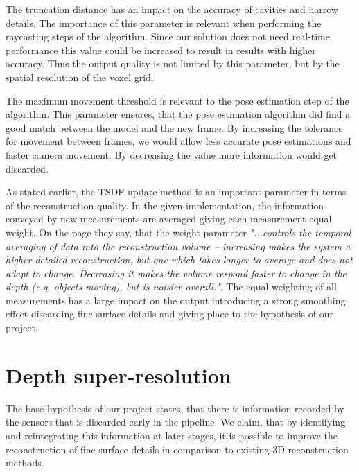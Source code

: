\documentclass{ucl_thesis}
\begin{document}
\par The truncation distance has an impact on the accuracy of cavities and narrow details. The importance of this parameter is relevant when performing the raycasting steps of the algorithm. Since our solution does not need real-time performance this value could be increased to result in results with higher accuracy. Thus the output quality is not limited by this parameter, but by the spatial resolution of the voxel grid.

\par The maximum movement threshold is relevant to the pose estimation step of the algorithm. This parameter ensures, that the pose estimation algorithm did find a good match between the model and the new frame. By increasing the tolerance for movement between frames, we would allow less accurate pose estimations and faster camera movement. By decreasing the value more information would get discarded.

\par As stated earlier, the TSDF update method is an important parameter in terms of the reconstruction quality. In the given implementation, the information conveyed by new measurements are averaged giving each measurement equal weight. On the \citep{KinectFuSDKExample} page they say, that the weight parameter {\it "...controls the temporal averaging of data into the reconstruction volume – increasing makes the system a higher detailed reconstruction, but one which takes longer to average and does not adapt to change. Decreasing it makes the volume respond faster to change in the depth (e.g. objects moving), but is noisier overall."}. The equal weighting of all measurements has a large impact on the output introducing a strong smoothing effect discarding fine surface details and giving place to the hypothesis of our project.

\section{Depth super-resolution}

\par The base hypothesis of our project states, that there is information recorded by the sensors that is discarded early in the pipeline. We claim, that by identifying and reintegrating this information at later stages, it is possible to improve the reconstruction of fine surface details in comparison to existing 3D reconstruction methods. 
\end{document}
